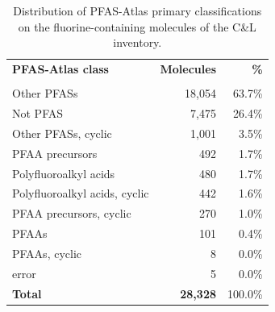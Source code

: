 \begin{table}[htbp]
\centering
\caption{Distribution of PFAS-Atlas primary classifications on  the fluorine-containing molecules of the C\&L inventory.}
\label{tab:clinventory_atlas_classes}
\begin{tabular}{lrr}
\toprule
\rowcolor[HTML]{D6E4F5}\textbf{PFAS-Atlas class} & \textbf{Molecules} & \textbf{\%} \\\\
\midrule
  \rowcolor[HTML]{FAEADE}Other PFASs & 18,054 & 63.7\% \\
  Not PFAS & 7,475 & 26.4\% \\
  \rowcolor[HTML]{FAEADE}Other PFASs, cyclic & 1,001 & 3.5\% \\
  PFAA precursors & 492 & 1.7\% \\
  \rowcolor[HTML]{FAEADE}Polyfluoroalkyl acids & 480 & 1.7\% \\
  Polyfluoroalkyl acids, cyclic & 442 & 1.6\% \\
  \rowcolor[HTML]{FAEADE}PFAA precursors, cyclic & 270 & 1.0\% \\
  PFAAs & 101 & 0.4\% \\
  \rowcolor[HTML]{FAEADE}PFAAs, cyclic & 8 & 0.0\% \\
  error & 5 & 0.0\% \\
\midrule
  \textbf{Total} & \textbf{28,328} & 100.0\% \\
\bottomrule
\end{tabular}
\end{table}


